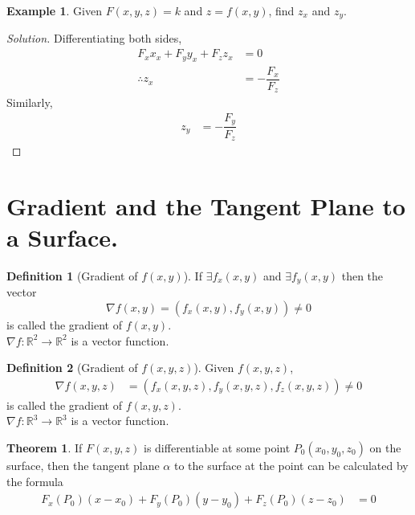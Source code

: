 \documentclass[fleqn, a4paper, 12pt]{article}
\theoremstyle{definition}
\newtheorem{example}{Example}
\newtheorem{definition}{Definition}
\theoremstyle{theorem}
\newtheorem{theorem}{Theorem}
\theoremstyle{remark}
\newenvironment{solution}
{\begin{proof}[Solution]\let\qed\relax}
	{\end{proof}}
\begin{document}
\begin{example}
	Given $F(x, y, z) = k$ and $z = f(x, y)$, find $z_x$ and $z_y$.
\end{example}

\begin{solution}
	Differentiating both sides,
	\begin{align*}
		F_x x_x + F_y y_x + F_z z_x &= 0\\
		\therefore z_x &= -\dfrac{F_x}{F_z}
	\end{align*}
	Similarly,
	\begin{align*}
		z_y &= -\dfrac{F_y}{F_z}
	\end{align*}
\end{solution}

\section{Gradient and the Tangent Plane to a Surface.}

\begin{definition}[Gradient of $f(x, y)$]
	If $\exists f_x(x, y)$ and $\exists f_y(x, y)$ then the vector 
	\begin{equation*}
		\nabla f(x, y) = (f_x(x, y), f_y(x, y)) \neq 0
	\end{equation*}
	is called the gradient of $f(x, y)$.\\
	$\nabla f : \mathbb{R}^2 \to \mathbb{R}^2$ is a vector function.
\end{definition}

\begin{definition}[Gradient of $f(x, y, z)$]
	Given $f(x, y, z)$,
	\begin{align*}
		\nabla f(x, y, z) &= (f_x(x, y, z), f_y(x, y, z), f_z(x, y, z)) \neq 0
	\end{align*}
	is called the gradient of $f(x, y, z)$.\\	
	$\nabla f : \mathbb{R}^3 \to \mathbb{R}^3$ is a vector function.
\end{definition}

\begin{theorem}
	If $F(x, y, z)$ is differentiable at some point $P_0 (x_0, y_0, z_0)$ on the surface, then the tangent plane $\alpha$ to the surface at the point can be calculated by the formula
	\begin{align*}
		F_x (P_0) (x - x_0) + F_y (P_0) (y - y_0) + F_z (P_0) (z - z_0) &= 0
	\end{align*}
\end{theorem}
\end{document}
